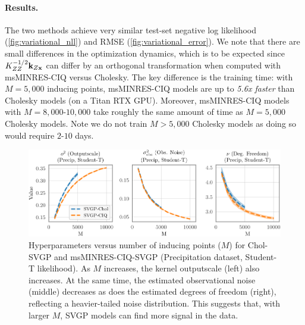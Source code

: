 \paragraph{Results.}
The two methods achieve very similar test-set negative log likelihood (\cref{fig:variational_nll}) and RMSE (\cref{fig:variational_error}).
We note that there are small
differences in the optimization dynamics, which is to be expected since $K_{ZZ}^{-1/2} \mathbf{k}_{Z\mathbf{x}}$ can differ by an orthogonal
transformation when computed with msMINRES-CIQ versus Cholesky.
The key difference is the training time:
with $M=5,\!000$ inducing points, msMINRES-CIQ models are up to \emph{5.6x faster} than Cholesky models (on a Titan RTX GPU).
Moreover, msMINRES-CIQ models with $M=8,\!000$-$10,\!000$ take roughly the same amount of time as $M=5,\!000$ Cholesky models.
Note we do not train $M > 5,\!000$ Cholesky models as doing so would require $2$-$10$ days.

\begin{figure}[t!]
  \centering
  \includegraphics[width=\linewidth]{figures/variational_stats.pdf}
  \caption[Hyperparameters of Cholesky and CIQ SVGP models.]{
    Hyperparameters versus number of inducing points ($M$) for Chol-SVGP and msMINRES-CIQ-SVGP (Precipitation dataset, Student-T likelihood).
    As $M$ increases, the kernel outputscale (left) also increases.
    At the same time, the estimated observational noise (middle) decreases as does the estimated degrees of freedom (right), reflecting a heavier-tailed noise distribution.
    This suggests that, with larger $M$, SVGP models can find more signal in the data.
  }
  \label{fig:variational_stats}
\end{figure}

